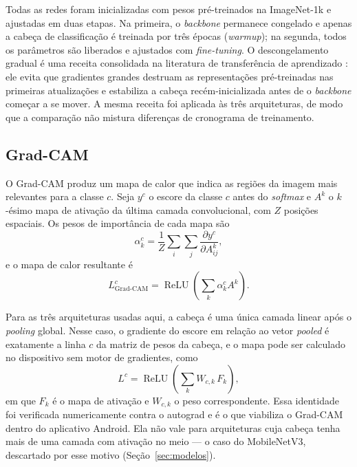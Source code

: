\documentclass[11pt,a4paper]{article}
\begin{document}
	Todas as redes foram inicializadas com pesos pré-treinados na ImageNet-1k e ajustadas em duas etapas. Na primeira, o \textit{backbone} permanece congelado e apenas a cabeça de classificação é treinada por três épocas (\emph{warmup}); na segunda, todos os parâmetros são liberados e ajustados com \emph{fine-tuning}. O descongelamento gradual é uma receita consolidada na literatura de transferência de aprendizado \cite{howardruder2018}: ele evita que gradientes grandes destruam as representações pré-treinadas nas primeiras atualizações e estabiliza a cabeça recém-inicializada antes de o \textit{backbone} começar a se mover. A mesma receita foi aplicada às três arquiteturas, de modo que a comparação não mistura diferenças de cronograma de treinamento.
	
	\subsection{Grad-CAM}
	
	O Grad-CAM \cite{selvaraju2017} produz um mapa de calor que indica as regiões da imagem mais relevantes para a classe $c$. Seja $y^c$ o escore da classe $c$ antes do \textit{softmax} e $A^k$ o $k$-ésimo mapa de ativação da última camada convolucional, com $Z$ posições espaciais. Os pesos de importância de cada mapa são
	\begin{equation}
		\alpha_k^c = \frac{1}{Z} \sum_{i} \sum_{j} \frac{\partial y^c}{\partial A^k_{ij}},
		\label{eq:gradcam-alpha}
	\end{equation}
	e o mapa de calor resultante é
	\begin{equation}
		L^c_{\text{Grad-CAM}} = \operatorname{ReLU}\!\left( \sum_{k} \alpha_k^c A^k \right).
		\label{eq:gradcam}
	\end{equation}
	
	Para as três arquiteturas usadas aqui, a cabeça é uma única camada linear após o \emph{pooling} global. Nesse caso, o gradiente do escore em relação ao vetor \emph{pooled} é exatamente a linha $c$ da matriz de pesos da cabeça, e o mapa pode ser calculado no dispositivo sem motor de gradientes, como
	\begin{equation}
		L^c = \operatorname{ReLU}\!\left( \sum_{k} W_{c,k}\, F_k \right),
		\label{eq:gradcam-linear}
	\end{equation}
	em que $F_k$ é o mapa de ativação e $W_{c,k}$ o peso correspondente. Essa identidade foi verificada numericamente contra o autograd e é o que viabiliza o Grad-CAM dentro do aplicativo Android. Ela não vale para arquiteturas cuja cabeça tenha mais de uma camada com ativação no meio --- o caso do MobileNetV3, descartado por esse motivo (Seção~\ref{sec:modelos}).
	
\end{document}
